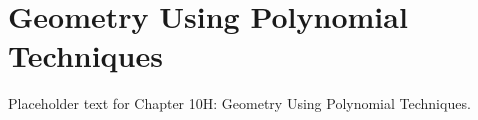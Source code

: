 \section{Geometry Using Polynomial Techniques}
Placeholder text for Chapter 10H: Geometry Using Polynomial Techniques.
